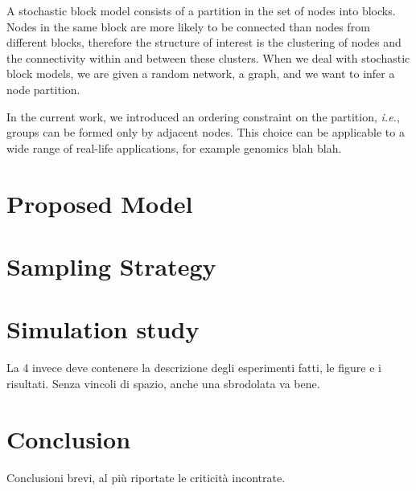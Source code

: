 A stochastic block model consists of a partition in the set of nodes into blocks. Nodes in the same block are more likely to be connected than nodes from different blocks, therefore the structure of interest is the clustering of nodes and the connectivity within and between these clusters.  When we deal with stochastic block models, we are given a random network, a graph, and we want to infer a node partition.


In the current work, we introduced an ordering constraint on the partition, \emph{i.e.}, groups can be formed only by adjacent nodes. This choice can be applicable to a wide range of real-life applications, for example genomics blah blah. 




\section{Proposed Model}


\section{Sampling Strategy}


\section{Simulation study}

La 4 invece deve contenere la descrizione degli esperimenti fatti, le figure e i risultati. Senza vincoli di spazio, anche una sbrodolata va bene.


\section{Conclusion}

Conclusioni brevi, al più riportate le criticità incontrate.
